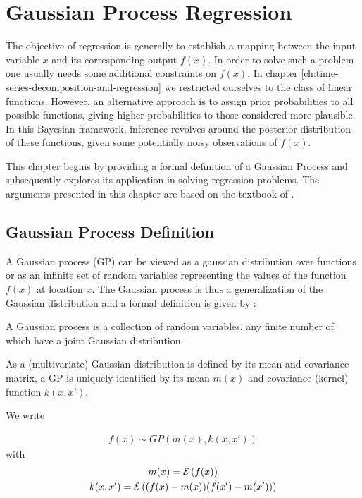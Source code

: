 \chapter{Gaussian Process Regression}\label{ch:gaussian-process-regression}
The objective of regression is generally to establish a mapping between the input variable $x$ and
its corresponding output $f(x)$.
In order to solve such a problem one usually needs some additional constraints on $f(x)$.
In chapter \ref{ch:time-series-decomposition-and-regression} we restricted ourselves to the class of linear functions.
However, an alternative approach is to assign prior probabilities to all possible functions,
giving higher probabilities to those considered more plausible. In this Bayesian framework,
inference revolves around the posterior distribution of these functions,
given some potentially noisy observations of $f(x)$.

This chapter begins by providing a formal definition of a Gaussian Process and subsequently explores its application
in solving regression problems.
The arguments presented in this chapter are based on the textbook of \citeauthor{rasmussen_gaussian_2006}.

\section{Gaussian Process Definition}\label{sec:gaussian-process-definition}

A Gaussian process (GP) can be viewed as a gaussian distribution over functions or as an infinite set of random
variables representing the values of the function $f(x)$ at location $x$.
The Gaussian process is thus a generalization of the Gaussian distribution and a formal definition is given
by \citeauthor{rasmussen_gaussian_2006} :

\begin{definition}\label{def:GP}
 A Gaussian process is a collection of random variables, any finite number of which have a joint Gaussian distribution.
\end{definition}


As a (multivariate) Gaussian distribution is defined by its mean and covariance matrix, a GP is
uniquely identified by its mean $m(x)$ and covariance (kernel) function $k(x,x')$.

We write

\begin{gather*}
    f(x) \sim GP(m(x), k(x,x'))
\end{gather*}
with
\begin{gather*}
    m(x) = \ERW{f(x)} \\
    k(x,x') = \ERW{(f(x)-m(x))(f(x')-m(x'))}
\end{gather*}

